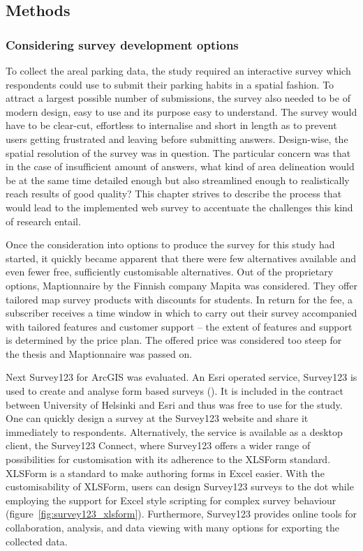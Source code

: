 \newpage
\subsection{Methods}
\subsubsection{Considering survey development options}
\justify

To collect the areal parking data, the study required an interactive survey which respondents could use to submit their parking habits in a spatial fashion. To attract a largest possible number of submissions, the survey also needed to be of modern design, easy to use and its purpose easy to understand. The survey would have to be clear-cut, effortless to internalise and short in length as to prevent users getting frustrated and leaving before submitting answers. Design-wise, the spatial resolution of the survey was in question. The particular concern was that in the case of insufficient amount of answers, what kind of area delineation would be at the same time detailed enough but also streamlined enough to realistically reach results of good quality? This chapter strives to describe the process that would lead to the implemented web survey to accentuate the challenges this kind of research entail.

Once the consideration into options to produce the survey for this study had started, it quickly became apparent that there were few alternatives available and even fewer free, sufficiently customisable alternatives. Out of the proprietary options, Maptionnaire by the Finnish company Mapita was considered. They offer tailored map survey products with discounts for students. In return for the fee, a subscriber receives a time window in which to carry out their survey accompanied with tailored features and customer support -- the extent of features and support is determined by the price plan. The offered price was considered too steep for the thesis and Maptionnaire was passed on. 

Next Survey123 for ArcGIS was evaluated. An Esri operated service, Survey123 is used to create and analyse form based surveys (\cite{Esri}). It is included in the contract between University of Helsinki and Esri and thus was free to use for the study. One can quickly design a survey at the Survey123 website and share it immediately to respondents. Alternatively, the service is available as a desktop client, the Survey123 Connect, where Survey123 offers a wider range of possibilities for customisation with its adherence to the XLSForm standard. XLSForm is a standard to make authoring forms in Excel easier. With the customisability of XLSForm, users can design Survey123 surveys to the dot while employing the support for Excel style scripting for complex survey behaviour (figure~\ref{fig:survey123_xlsform}). Furthermore, Survey123 provides online tools for collaboration, analysis, and data viewing with many options for exporting the collected data.

